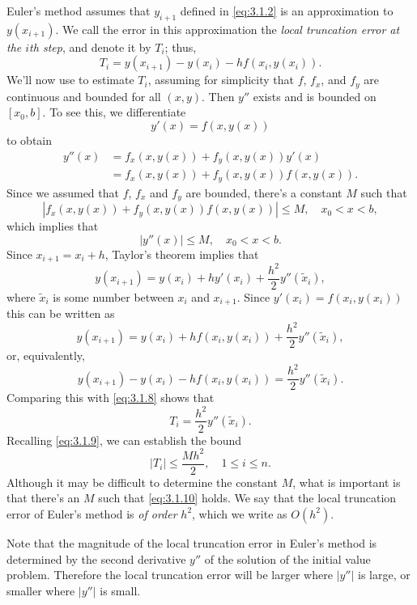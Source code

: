 Euler's method assumes that $y_{i+1}$ defined in \eqref{eq:3.1.2}  is
an approximation to $y(x_{i+1})$. We call the error in this
approximation the \emph{\color{blue}local truncation error at the $i$th step},
and denote it by $T_i$;   thus,
\begin{equation} \label{eq:3.1.8}
T_i=y(x_{i+1})-y(x_i)-hf(x_i,y(x_i)).
\end{equation}
We'll now use
 to estimate $T_i$, assuming for
simplicity that $f$, $f_x$, and $f_y$ are continuous and bounded for
all $(x,y)$. Then $y''$ exists and is bounded on $[x_0,b]$. To see
this, we differentiate
\[
y'(x)=f(x,y(x))
\]
to obtain
\begin{align*}
y''(x) & = f_x(x,y(x))+f_y(x,y(x))y'(x)\\
 & = f_x(x,y(x))+f_y(x,y(x))f(x,y(x)).
\end{align*}
Since we assumed that $f$, $f_x$ and $f_y$ are bounded, there's
a constant $M$ such that
\[
|f_x(x,y(x))+f_y(x,y(x))f(x,y(x))|\le M,\quad x_0<x<b,
\]
which implies that
\begin{equation} \label{eq:3.1.9}
|y''(x)|\le M,\quad x_0<x<b.
\end{equation}
Since $x_{i+1}=x_i+h$, Taylor's theorem implies that
\[
y(x_{i+1})=y(x_i)+hy'(x_i)+\frac{h^2}{2}y''(\tilde x_i),
\]
where $\tilde x_i$ is some number between $x_i$ and $x_{i+1}$.
Since $y'(x_i)=f(x_i,y(x_i))$  this can be written as
\[
y(x_{i+1})=y(x_i)+hf(x_i,y(x_i))+\frac{h^2}{2}y''(\tilde x_i),
\]
or, equivalently,
\[
y(x_{i+1})-y(x_i)-hf(x_i,y(x_i))=\frac{h^2}{2}y''(\tilde x_i).
\]
Comparing this with \eqref{eq:3.1.8} shows that
\[
T_i=\frac{h^2}{2}y''(\tilde x_i).
\]
Recalling \eqref{eq:3.1.9}, we can establish the bound
\begin{equation} \label{eq:3.1.10}
|T_i|\le\frac{Mh^2}{2},\quad 1\le i\le n.
\end{equation}
Although it may be difficult to determine the constant $M$, what is
important is that there's an $M$ such that \eqref{eq:3.1.10} holds.
 We say that the
local truncation error of Euler's
method
is \emph{\color{blue}of order} $h^2$,
which we write as $O(h^2)$.

Note that the magnitude of the local truncation error in
Euler's method is determined by the second derivative $y''$ of the
solution of the initial value problem. Therefore
 the local truncation error will be larger where $|y''|$ is large,
or smaller where $|y''|$ is small.

